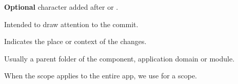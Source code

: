 \documentclass{cheatsheet}
\begin{document}
\begin{minipage}[t]{.75\linewidth}
        \begin{minipage}[t]{.5\linewidth}
            \bigskip
            \sheetTitle{\color{emobg2}!}
            \textbf{Optional} character added after  or . \par
            Intended to draw attention to the commit.
        \end{minipage}%
        \begin{minipage}[t]{.5\linewidth}
            \bigskip
            Indicates the place or context of the changes.\par
            Usually a parent folder of the component, application domain or module. \par
            \bigskip
            When the scope applies to the entire app, we use  for a scope.
        \end{minipage}%
    \end{minipage}%
    \begin{minipage}[t]{.25\linewidth}
        \sheetHeader
    \end{minipage}%

\end{document}
